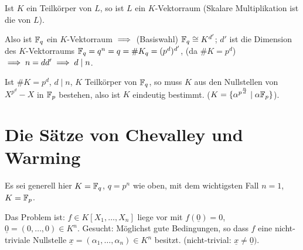 \documentclass[a4paper,DIV15,BCOR12mm]{article}
\begin{document}

\begin{beweis}
\begin{bemerkung}
Ist $K$ ein Teilkörper von $L$, so ist $L$ ein $K$-Vektorraum (Skalare Multiplikation ist die von $L$). 
\end{bemerkung}
Also ist $\mathbb{F}_q$ ein $K$-Vektorraum $\implies$ (Basiswahl) $\mathbb{F}_q \cong K^{d'}$; $d'$ ist die Dimension des $K$-Vektorraums $\mathbb{F}_q = q^n= q=\#K_q=(p^d)^{d'}$, (da $\#K=p^d$) $\implies n= dd' \implies d\mid n$. 

Ist $\#K=p^d$, $d\mid n$, $K$ Teilkörper von $\mathbb{F}_q$, so muss $K$ aus den Nullstellen von $X^{p^d}-X$ in $\mathbb{F}_p$ bestehen, also ist $K$ eindeutig bestimmt. ($K=\{\alpha^{p^{\frac n d}}\mid \alpha \mathbb{F}_p\}$).
\end{beweis}

\section{Die Sätze von Chevalley und Warming}

Es sei generell hier $K=\mathbb{F}_q$, $q=p^n$ wie oben, mit dem wichtigsten Fall $n=1$, $K=\mathbb{F}_p$.

Das Problem ist: $f\in K[X_1,\ldots,X_n]$ liege vor mit $f(\underline 0) = 0$, $\underline0 = (0,\ldots,0)\in K^n$. Gesucht: Möglichst gute Bedingungen, so dass $f$ eine nicht-triviale Nullstelle $\underline x = (\alpha_1,\ldots,\alpha_n) \in K^n$ besitzt. (nicht-trivial: $\underline x \ne \underline 0)$.
\end{document}

